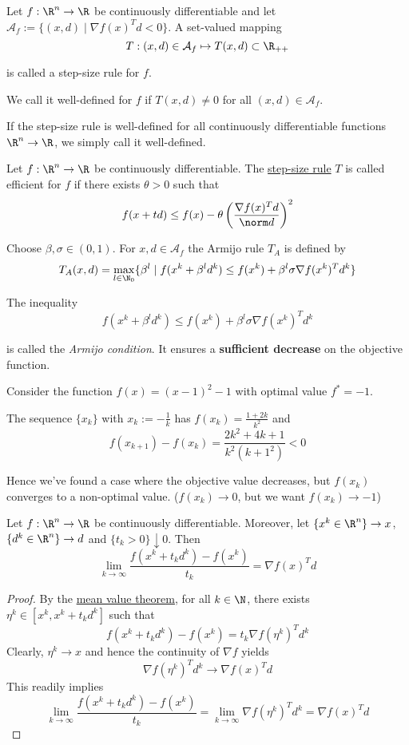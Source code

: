 Let $f:{\R}^n\to{\R}$ be continuously differentiable and
let $\mathcal A_f:=\{(x,d)\mid\nabla f(x)^Td<0\}$. A set-valued
mapping
$$
	T:(x,d)\in\mathcal A_f\mapsto T(x,d)\subset\R_{++}
$$

is called a step-size rule for $f$.

We call it well-defined for $f$ if $T(x,d)\neq0$ for all
$(x,d)\in\mathcal{A}_f$.

If the step-size rule is well-defined for all continuously
differentiable functions ${\R}^n\to{\R}$, we simply call it
well-defined.

\label{d23fdf0}

Let $f:\R^n\to\R$ be continuously differentiable. The
\hyperref[ae4eac6]{step-size rule} $T$ is called efficient for $f$ if
there exists $\theta>0$ such that
$$
	f(x+td)\leq f(x)-\theta\left(\frac{\nabla f(x)^Td}{\norm d}\right)^2
$$

\label{fefb024}

Choose $\beta,\sigma\in(0,1)$. For $x,d\in\hyperref[ae4eac6]{\mathcal
		A_f}$ the Armijo rule $T_A$ is defined by
$$
	T_A(x,d)=\max_{l\in\N_0}\{\beta^l\mid f(x^k+\beta^ld^k)\leq
	f(x^k)+\beta^l\sigma\nabla f(x^k)^Td^k\}
$$

The inequality
$$
	f(x^k+\beta^ld^k)\leq f(x^k)+\beta^l\sigma\nabla f(x^k)^Td^k
$$

is called the \textit{Armijo condition}. It ensures a
\textbf{sufficient decrease} on the objective function.

\label{ae7f42d}

Consider the function $f(x)=(x-1)^2-1$ with optimal value $f^*=-1$.

The sequence $\{x_k\}$ with $x_k:=-\frac1k$ has
$f(x_k)=\frac{1+2k}{k^2}$ and
$$
	f(x_{k+1})-f(x_k)=\frac{2k^2+4k+1}{k^2(k+1^2)}<0
$$

Hence we've found a case where the objective value decreases, but
$f(x_k)$ converges to a non-optimal value. ($f(x_k)\to0$, but we want
$f(x_k)\to-1$)

\label{f8e1f12}

Let $f:\R^n\to\R$ be continuously differentiable. Moreover, let
$\{x^k\in\R^n\}\to x$, $\{d^k\in\R^n\}\to d$ and
$\{t_k>0\}\downarrow0$. Then
$$
	\lim_{k\to\infty}\frac{f(x^k+t_kd^k)-f(x^k)}{t_k}=\nabla f(x)^Td
$$

\begin{proof}
	By the \hyperref[d37aa2b]{mean value theorem}, for all $k\in\N$,
	there exists $\eta^k\in[x^k,x^k+t_kd^k]$ such that
	$$
		f(x^k+t_kd^k)-f(x^k)=t_k\nabla f(\eta^k)^Td^k
	$$
	Clearly, $\eta^k\to x$ and hence the continuity of $\nabla f$ yields
	$$
		\nabla f(\eta^k)^Td^k\to\nabla f(x)^Td
	$$
	This readily implies
	$$
		\lim_{k\to\infty}\frac{f(x^k+t_kd^k)-f(x^k)}{t_k}=
		\lim_{k\to\infty}\nabla f(\eta^k)^Td^k=
		\nabla f(x)^Td
	$$
\end{proof}

